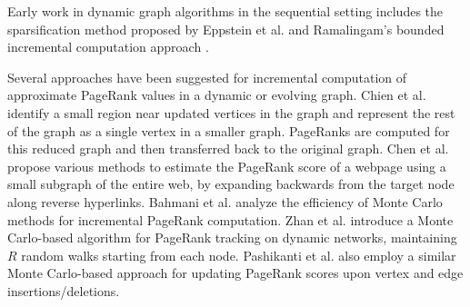 Early work in dynamic graph algorithms in the sequential setting includes the sparsification method proposed by Eppstein et al. \cite{graph-eppstein97} and Ramalingam's bounded incremental computation approach \cite{incr-ramalingam96}. Several approaches have been suggested for incremental computation of approximate PageRank values in a dynamic or evolving graph. Chien et al. \cite{rank-chien01} identify a small region near updated vertices in the graph and represent the rest of the graph as a single vertex in a smaller graph. PageRanks are computed for this reduced graph and then transferred back to the original graph. Chen et al. \cite{chen2004local} propose various methods to estimate the PageRank score of a webpage using a small subgraph of the entire web, by expanding backwards from the target node along reverse hyperlinks. Bahmani et al. \cite{bahmani2010fast} analyze the efficiency of Monte Carlo methods for incremental PageRank computation. Zhan et al. \cite{zhan2019fast} introduce a Monte Carlo-based algorithm for PageRank tracking on dynamic networks, maintaining $R$ random walks starting from each node. Pashikanti et al. \cite{rank-pashikanti22} also employ a similar Monte Carlo-based approach for updating PageRank scores upon vertex and edge insertions/deletions.

